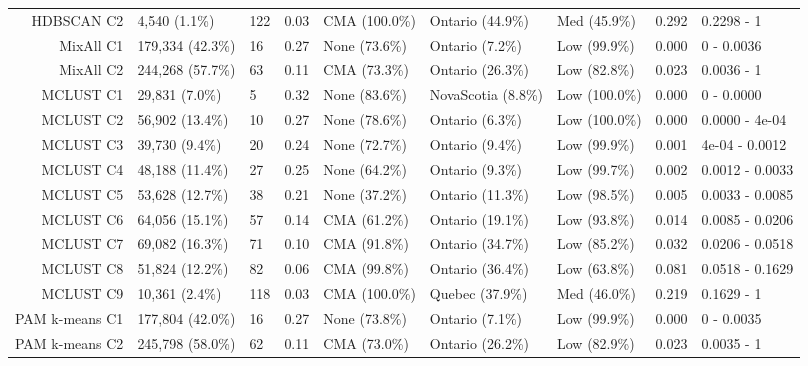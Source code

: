 \documentclass[11pt, a4paper]{article}
\begin{document}
\begin{table}[H]
{\begin{tabular}{|r|llllllll|}
\rowcolor{gray!25}  HDBSCAN C2 & 4,540 (1.1\%) & 122 & 0.03 & CMA (100.0\%) & Ontario (44.9\%) & Med (45.9\%) & 0.292 & 0.2298 - 1 \\ 
  MixAll C1 & 179,334 (42.3\%) & 16 & 0.27 & None (73.6\%) & Ontario (7.2\%) & Low (99.9\%) & 0.000 & 0 - 0.0036 \\ 
  MixAll C2 & 244,268 (57.7\%) & 63 & 0.11 & CMA (73.3\%) & Ontario (26.3\%) & Low (82.8\%) & 0.023 & 0.0036 - 1 \\ 
\rowcolor{gray!25}  MCLUST C1 & 29,831 (7.0\%) & 5 & 0.32 & None (83.6\%) & NovaScotia (8.8\%) & Low (100.0\%) & 0.000 & 0 - 0.0000 \\ 
\rowcolor{gray!25}  MCLUST C2 & 56,902 (13.4\%) & 10 & 0.27 & None (78.6\%) & Ontario (6.3\%) & Low (100.0\%) & 0.000 & 0.0000 - 4e-04 \\ 
 \rowcolor{gray!25} MCLUST C3 & 39,730 (9.4\%) & 20 & 0.24 & None (72.7\%) & Ontario (9.4\%) & Low (99.9\%) & 0.001 & 4e-04 - 0.0012 \\ 
 \rowcolor{gray!25} MCLUST C4 & 48,188 (11.4\%) & 27 & 0.25 & None (64.2\%) & Ontario (9.3\%) & Low (99.7\%) & 0.002 & 0.0012 - 0.0033 \\ 
 \rowcolor{gray!25} MCLUST C5 & 53,628 (12.7\%) & 38 & 0.21 & None (37.2\%) & Ontario (11.3\%) & Low (98.5\%) & 0.005 & 0.0033 - 0.0085 \\ 
\rowcolor{gray!25}  MCLUST C6 & 64,056 (15.1\%) & 57 & 0.14 & CMA (61.2\%) & Ontario (19.1\%) & Low (93.8\%) & 0.014 & 0.0085 - 0.0206 \\ 
 \rowcolor{gray!25} MCLUST C7 & 69,082 (16.3\%) & 71 & 0.10 & CMA (91.8\%) & Ontario (34.7\%) & Low (85.2\%) & 0.032 & 0.0206 - 0.0518 \\ 
\rowcolor{gray!25}  MCLUST C8 & 51,824 (12.2\%) & 82 & 0.06 & CMA (99.8\%) & Ontario (36.4\%) & Low (63.8\%) & 0.081 & 0.0518 - 0.1629 \\ 
 \rowcolor{gray!25} MCLUST C9 & 10,361 (2.4\%) & 118 & 0.03 & CMA (100.0\%) & Quebec (37.9\%) & Med (46.0\%) & 0.219 & 0.1629 - 1 \\ 
  PAM k-means C1 & 177,804 (42.0\%) & 16 & 0.27 & None (73.8\%) & Ontario (7.1\%) & Low (99.9\%) & 0.000 & 0 - 0.0035 \\ 
  PAM k-means C2 & 245,798 (58.0\%) & 62 & 0.11 & CMA (73.0\%) & Ontario (26.2\%) & Low (82.9\%) & 0.023 & 0.0035 - 1 \\ 
   \hline
\end{tabular}
}
\end{table}
\end{document}

